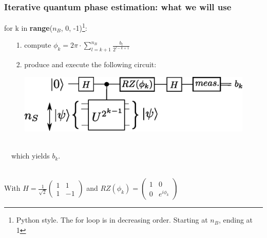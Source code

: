 \documentclass{beamer}
\begin{document}
\begin{frame}
\frametitle{Iterative quantum phase estimation: what we will use}

{\selectfont for k in \textbf{range}($n_{B}$, 0, -1)\footnote{Python style. The for loop is in decreasing order. Starting at $n_B$, ending at 1}:
\begin{itemize}
\item[1.] compute $\phi_{k}=2\pi\cdot\sum_{l=k+1}^{n_{B}} \frac{b_{l}}{2^{l-k+1}}$
\item[2.] produce and execute the following circuit: 
\end{itemize}
\begin{figure}
\includegraphics[width=.6\textwidth]{iterative_pea.eps}
\end{figure}~\\
$\quad$which yields $b_{k}$.\\~\\
}

With $H=\frac{1}{\sqrt{2}}\begin{pmatrix}1 & 1 \\ 1 & -1 \end{pmatrix}$ and 
$RZ(\phi_{k})=\begin{pmatrix} 1 & 0 \\ 0 & e^{i\phi_{k}}\end{pmatrix}$

\end{frame}
\end{document}
